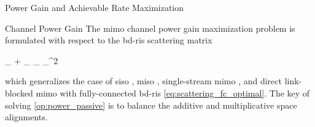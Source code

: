 \documentclass[journal]{IEEEtran}
\begin{document}
\begin{section}{Power Gain and Achievable Rate Maximization}
	\label{sc:power_rate}
	\begin{subsection}{Channel Power Gain}\label{sc:power}
		The \gls{mimo} channel power gain maximization problem is formulated with respect to the \gls{bd}-\gls{ris} scattering matrix
		\begin{maxi!}
			{\scriptstyle{\mathbf{\Theta}}}{\lVert {}_ + _ \mathbf{\Theta} _ \rVert _^2}{\label{op:power_passive}}{\label{ob:power_passive}}
		\end{maxi!}
		which generalizes the case of \gls{siso} \cite{Shen2020a}, \gls{miso} \cite{Santamaria2023,Fang2023}, single-stream \gls{mimo} \cite{Nerini2023,Nerini2023b}, and direct link-blocked \gls{mimo} with fully-connected \gls{bd}-\gls{ris} \eqref{eq:scattering_fc_optimal}.
		The key of solving \eqref{op:power_passive} is to balance the additive and multiplicative space alignments.


\end{subsection}
\end{section}
\end{document}
